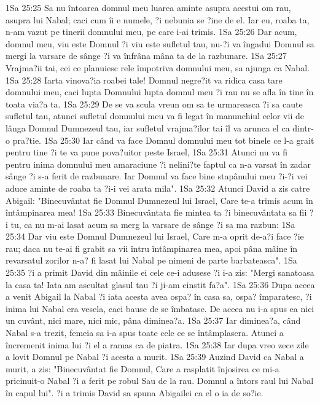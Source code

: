 1Sa 25:25  Sa nu întoarca domnul meu luarea aminte asupra acestui om rau, asupra lui Nabal; caci cum îi e numele, ?i nebunia se ?ine de el. Iar eu, roaba ta, n-am vazut pe tinerii domnului meu, pe care i-ai trimis.
1Sa 25:26  Dar acum, domnul meu, viu este Domnul ?i viu este sufletul tau, nu-?i va îngadui Domnul sa mergi la varsare de sânge ?i va înfrâna mâna ta de la razbunare.
1Sa 25:27  Vrajma?ii tai, cei ce planuiesc rele împotriva domnului meu, sa ajunga ca Nabal.
1Sa 25:28  Iarta vinova?ia roabei tale! Domnul negre?it va ridica casa tare domnului meu, caci lupta Domnului lupta domnul meu ?i rau nu se afla în tine în toata via?a ta.
1Sa 25:29  De se va scula vreun om sa te urmareasca ?i sa caute sufletul tau, atunci sufletul domnului meu va fi legat în manunchiul celor vii de lânga Domnul Dumnezeul tau, iar sufletul vrajma?ilor tai îl va arunca el ca dintr-o pra?tie.
1Sa 25:30  Iar când va face Domnul domnului meu tot binele ce l-a grait pentru tine ?i te va pune pova?uitor peste Israel,
1Sa 25:31  Atunci nu va fi pentru inima domnului meu amaraciune ?i nelini?te faptul ca n-a varsat în zadar sânge ?i s-a ferit de razbunare. Iar Domnul va face bine stapânului meu ?i-?i vei aduce aminte de roaba ta ?i-i vei arata mila".
1Sa 25:32  Atunci David a zis catre Abigail: "Binecuvântat fie Domnul Dumnezeul lui Israel, Care te-a trimis acum în întâmpinarea mea!
1Sa 25:33  Binecuvântata fie mintea ta ?i binecuvântata sa fii ?i tu, ca nu m-ai lasat acum sa merg la varsare de sânge ?i sa ma razbun:
1Sa 25:34  Dar viu este Domnul Dumnezeul lui Israel, Care m-a oprit de-a?i face ?ie rau; daca nu te-ai fi grabit sa vii întru întâmpinarea mea, apoi pâna mâine în revarsatul zorilor n-a? fi lasat lui Nabal pe nimeni de parte barbateasca".
1Sa 25:35  ?i a primit David din mâinile ei cele ce-i adusese ?i i-a zis: "Mergi sanatoasa la casa ta! Iata am ascultat glasul tau ?i ji-am cinstit fa?a".
1Sa 25:36  Dupa aceea a venit Abigail la Nabal ?i iata acesta avea ospa? în casa sa, ospa? împaratesc, ?i inima lui Nabal era vesela, caci bause de se îmbatase. De aceea nu i-a spus ea nici un cuvânt, nici mare, nici mic, pâna diminea?a.
1Sa 25:37  Iar diminea?a, când Nabal s-a trezit, femeia sa i-a spus toate cele ce se întâmplasera. Atunci a încremenit inima lui ?i el a ramas ca de piatra.
1Sa 25:38  Iar dupa vreo zece zile a lovit Domnul pe Nabal ?i acesta a murit.
1Sa 25:39  Auzind David ca Nabal a murit, a zis: "Binecuvântat fie Domnul, Care a rasplatit înjosirea ce mi-a pricinuit-o Nabal ?i a ferit pe robul Sau de la rau. Domnul a întors raul lui Nabal în capul lui". ?i a trimis David sa spuna Abigailei ca el o ia de so?ie.
